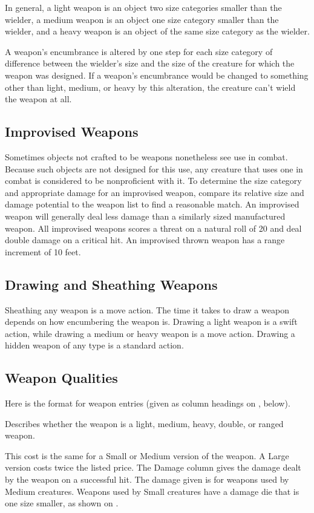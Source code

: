  In general, a light weapon is an object two size categories smaller than the wielder, a medium weapon is an object one size category smaller than the wielder, and a heavy weapon is an object of the same size category as the wielder.

 A weapon's encumbrance is altered by one step for each size category of difference between the wielder's size and the size of the creature for which the weapon was designed. If a weapon's encumbrance would be changed to something other than light, medium, or heavy by this alteration, the creature can't wield the weapon at all.

\subsection{Improvised Weapons} Sometimes objects not crafted to be weapons nonetheless see use in combat. Because such objects are not designed for this use, any creature that uses one in combat is considered to be nonproficient with it. To determine the size category and appropriate damage for an improvised weapon, compare its relative size and damage potential to the weapon list to find a reasonable match. An improvised weapon will generally deal less damage than a similarly sized manufactured weapon. All improvised weapons scores a threat on a natural roll of 20 and deal double damage on a critical hit. An improvised thrown weapon has a range increment of 10 feet.

\subsection{Drawing and Sheathing Weapons}
Sheathing any weapon is a move action. The time it takes to draw a weapon depends on how encumbering the weapon is. Drawing a light weapon is a swift action, while drawing a medium or heavy weapon is a move action. Drawing a hidden weapon of any type is a standard action. 

\subsection{Weapon Qualities}
Here is the format for weapon entries (given as column headings on , below).

 Describes whether the weapon is a light, medium, heavy, double, or ranged weapon.

\par This cost is the same for a Small or Medium version of the weapon. A Large version costs twice the listed price.
 The Damage column gives the damage dealt by the weapon on a successful hit. The damage given is for weapons used by Medium creatures. Weapons used by Small creatures have a damage die that is one size smaller, as shown on .

